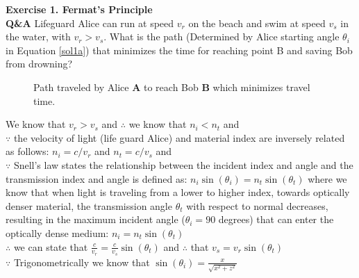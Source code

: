 \documentclass[main.tex]{subfiles}
\begin{document}
\textbf{Exercise 1. Fermat's Principle}\\

\textbf{Q\&A} Lifeguard Alice can run at speed $v_r$ on the beach and swim at speed $v_s$ in the water, with $v_r > v_s$. What is the path (Determined by Alice starting angle $\theta_i$ in Equation \ref{sol1a}) that minimizes the time for reaching point B and saving Bob from drowning?\\

\begin{figure}
\centering{}
\caption{Path traveled by Alice \textbf{A} to reach Bob \textbf{B} which minimizes travel time.}
\label{fig:1}
\end{figure}

We know that $v_r > v_s$ and $\therefore$ we know that $n_i < n_t$ and \\

$\because$ the velocity of light (life guard Alice) and material index are inversely related as follows:  $n_i = c / v_r$ and $n_t = c / v_s$ and \\

$\because$ Snell's law states the relationship between the incident index and angle and the transmission index and angle is defined as: $n_i\sin(\theta_i) = n_t \sin(\theta_{t})$ where we know that when light is traveling from a lower to higher index, towards optically denser material, the transmission angle $\theta_t$ with respect to normal decreases, resulting in the maximum incident angle ($\theta_i = 90$ degrees) that can enter the optically dense medium: $n_i = n_t \sin(\theta_t)$\\

$\therefore$ we can state that $\frac{c}{v_r} = \frac{c}{v_s} \sin(\theta_t)$ and $\therefore$ that $v_s = v_r \sin(\theta_t)$\\

$\because$ Trigonometrically we know that $\sin(\theta_i) = \frac{x}{\sqrt{x^2 + z^2}}$\\
\end{document}
